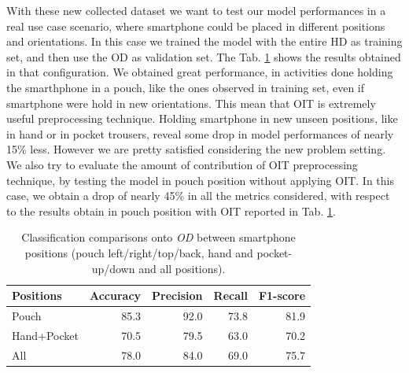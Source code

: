 With these new collected dataset we want to test our model performances in a real use case scenario, where smartphone could be placed in different positions and orientations. In this case we trained the model with the entire HD as training set, and then use the OD as validation set. The Tab. \ref{tab:model-oit-performance} shows the results obtained in that configuration. We obtained great performance, in activities done holding the smarthphone in a pouch, like the ones observed in training set, even if smartphone were hold in new orientations. This mean that OIT is extremely useful preprocessing technique.
Holding smartphone in new unseen positions, like in hand or in pocket trousers, reveal some drop in model performances of nearly 15\% less. However we are pretty satisfied considering the new problem setting.
We also try to evaluate the amount of contribution of OIT preprocessing technique, by testing the model in pouch position without applying OIT. In this case, we obtain a drop of nearly 45\% in all the metrics considered, with respect to the results obtain in pouch position with OIT reported in Tab. \ref{tab:model-oit-performance}.

\begin{table}[ht]
  \begin{center}
    \begin{tabular}{p{1.8cm}rrrr}
      \hline
      Positions & Accuracy & Precision & Recall & F1-score \\
      \hline
      Pouch & 85.3 & 92.0 & 73.8 & 81.9 \\
      Hand+Pocket & 70.5 & 79.5 & 63.0 & 70.2 \\
      All & 78.0 & 84.0 & 69.0 & 75.7 \\
      \hline
    \end{tabular}
    \caption{Classification comparisons onto \textit{OD} between
      smartphone positions (pouch left/right/top/back, hand and
      pocket-up/down and all positions).}
    \label{tab:model-oit-performance}
  \end{center}
\end{table}


